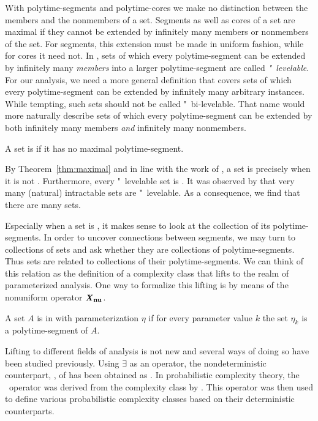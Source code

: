 With polytime-segments and polytime-cores we make no distinction between the members and the nonmembers of a set.
Segments as well as cores of a set are maximal if they cannot be extended by infinitely many members or nonmembers of the set.
For segments, this extension must be made in uniform fashion, while for cores it need not.
In \parencite{orponen1985polynomial,orponen1986optimal}, sets of which every polytime-segment can be extended by infinitely many \emph{members} into a larger polytime-segment are called \emph{"~levelable}.
For our analysis, we need a more general definition that covers sets of which every polytime-segment can be extended by infinitely many arbitrary instances.
While tempting, such sets should not be called "~bi-levelable.
That name would more naturally describe sets of which every polytime-segment can be extended by both infinitely many members \emph{and} infinitely many nonmembers.
\begin{definition}
  A set is  if it has no maximal polytime-segment.
\end{definition}
By Theorem~\ref{thm:maximal} and in line with the work of \textcite{orponen1985polynomial}, a set is  precisely when it is not .
Furthermore, every "~levelable set is .
It was observed by \textcite{orponen1986optimal} that very many (natural) intractable sets are "~levelable.
As a consequence, we find that there are many  sets.

Especially when a set is , it makes sense to look at the collection of its polytime-segments.
In order to uncover connections between segments, we may turn to collections of sets and ask whether they are collections of polytime-segments.
Thus sets are related to collections of their polytime-segments.
We can think of this relation as the definition of a complexity class that lifts  to the realm of parameterized analysis.
One way to formalize this lifting is by means of the nonuniform operator $\textnormal{\textbf{\textit{X}$_\textbf{nu}$}}$.
\begin{definition}
  A set $A$ is in  with parameterization $\eta$ if for every parameter value $k$ the set $\eta_k$ is a polytime-segment of $A$.
\end{definition}

Lifting  to different fields of analysis is not new and several ways of doing so have been studied previously.
Using $\exists$ as an operator, the nondeterministic counterpart, , of  has been obtained as .
In probabilistic complexity theory, the ~operator was derived from the complexity class  by \textcite{schoning1989probabilistic}.
This operator was then used to define various probabilistic complexity classes based on their deterministic counterparts.

